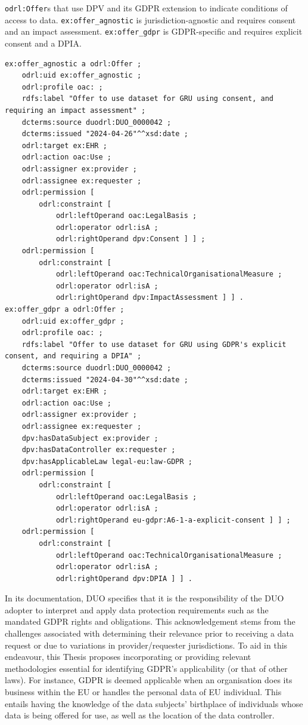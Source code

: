 \begin{listing}[htp]
\caption[\texttt{odrl:Offer}s for DUO that use DPV and its GDPR extension.]{\texttt{odrl:Offer}s that use DPV and its GDPR extension to indicate conditions of access to data. \texttt{ex:offer\_agnostic} is jurisdiction-agnostic and requires consent and an impact assessment. \texttt{ex:offer\_gdpr} is GDPR-specific and requires explicit consent and a DPIA.}
\label{list:duodrol_dpv}
\begin{verbatim}
ex:offer_agnostic a odrl:Offer ;
    odrl:uid ex:offer_agnostic ;
    odrl:profile oac: ;
    rdfs:label "Offer to use dataset for GRU using consent, and requiring an impact assessment" ;
    dcterms:source duodrl:DUO_0000042 ;
    dcterms:issued "2024-04-26"^^xsd:date ;
    odrl:target ex:EHR ;
    odrl:action oac:Use ;
    odrl:assigner ex:provider ;
    odrl:assignee ex:requester ;
    odrl:permission [
        odrl:constraint [ 
            odrl:leftOperand oac:LegalBasis ;
            odrl:operator odrl:isA ;
            odrl:rightOperand dpv:Consent ] ] ;
    odrl:permission [
        odrl:constraint [ 
            odrl:leftOperand oac:TechnicalOrganisationalMeasure ;
            odrl:operator odrl:isA ;
            odrl:rightOperand dpv:ImpactAssessment ] ] .
ex:offer_gdpr a odrl:Offer ;
    odrl:uid ex:offer_gdpr ;
    odrl:profile oac: ;
    rdfs:label "Offer to use dataset for GRU using GDPR's explicit consent, and requiring a DPIA" ;
    dcterms:source duodrl:DUO_0000042 ;
    dcterms:issued "2024-04-30"^^xsd:date ;
    odrl:target ex:EHR ;
    odrl:action oac:Use ;
    odrl:assigner ex:provider ;
    odrl:assignee ex:requester ;
    dpv:hasDataSubject ex:provider ;
    dpv:hasDataController ex:requester ;
    dpv:hasApplicableLaw legal-eu:law-GDPR ;
    odrl:permission [
        odrl:constraint [
            odrl:leftOperand oac:LegalBasis ;
            odrl:operator odrl:isA ;
            odrl:rightOperand eu-gdpr:A6-1-a-explicit-consent ] ] ;
    odrl:permission [
        odrl:constraint [ 
            odrl:leftOperand oac:TechnicalOrganisationalMeasure ;
            odrl:operator odrl:isA ;
            odrl:rightOperand dpv:DPIA ] ] .
\end{verbatim}
\end{listing}

In its documentation, DUO specifies that it is the responsibility of the DUO adopter to interpret and apply data protection requirements such as the mandated GDPR rights and obligations.
This acknowledgement stems from the challenges associated with determining their relevance prior to receiving a data request or due to variations in provider/requester jurisdictions.
To aid in this endeavour, this Thesis proposes incorporating or providing relevant methodologies essential for identifying GDPR's applicability (or that of other laws).
For instance, GDPR is deemed applicable when an organisation does its business within the EU or handles the personal data of EU individual. 
This entails having the knowledge of the data subjects' birthplace of individuals whose data is being offered for use, as well as the location of the data controller.

